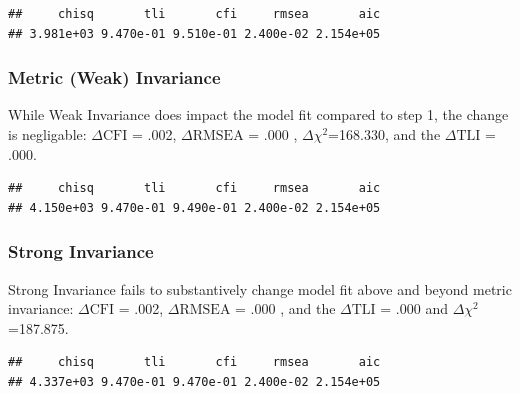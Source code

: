 \documentclass{article}\usepackage[]{graphicx}\usepackage[]{color}
\makeatletter
\newenvironment{kframe}{%
 \def\at@end@of@kframe{}%
 \ifinner\ifhmode%
  \def\at@end@of@kframe{\end{minipage}}%
  \begin{minipage}{\columnwidth}%
 \fi\fi%
 \def\FrameCommand##1{\hskip\@totalleftmargin \hskip-\fboxsep
 \colorbox{shadecolor}{##1}\hskip-\fboxsep
     \hskip-\linewidth \hskip-\@totalleftmargin \hskip\columnwidth}%
 \MakeFramed {\advance\hsize-\width
   \@totalleftmargin\z@ \linewidth\hsize
   \@setminipage}}%
 {\par\unskip\endMakeFramed%
 \at@end@of@kframe}
\newenvironment{knitrout}{}{} %
\makeatother
\begin{document}
\begin{knitrout}
\color{fgcolor}\begin{kframe}
\begin{verbatim}
##     chisq       tli       cfi     rmsea       aic 
## 3.981e+03 9.470e-01 9.510e-01 2.400e-02 2.154e+05
\end{verbatim}
\end{kframe}
\end{knitrout}


\subsubsection{Metric (Weak) Invariance}
While Weak Invariance does impact the model fit compared to step 1, the change is negligable: $\Delta\mathrm{CFI}$ = .002, $\Delta\mathrm{RMSEA}$ = .000 , $\Delta$$\chi^2$=168.330, and the $\Delta\mathrm{TLI}$ = .000.

\begin{knitrout}
\color{fgcolor}\begin{kframe}
\begin{verbatim}
##     chisq       tli       cfi     rmsea       aic 
## 4.150e+03 9.470e-01 9.490e-01 2.400e-02 2.154e+05
\end{verbatim}
\end{kframe}
\end{knitrout}


\subsubsection{Strong Invariance}
Strong Invariance fails to substantively change model fit above and beyond metric invariance: $\Delta\mathrm{CFI}$ = .002, $\Delta\mathrm{RMSEA}$ = .000 , and the $\Delta\mathrm{TLI}$ = .000 and $\Delta$$\chi^2$=187.875.
\begin{knitrout}
\color{fgcolor}\begin{kframe}
\begin{verbatim}
##     chisq       tli       cfi     rmsea       aic 
## 4.337e+03 9.470e-01 9.470e-01 2.400e-02 2.154e+05
\end{verbatim}
\end{kframe}
\end{knitrout}
\end{document}
